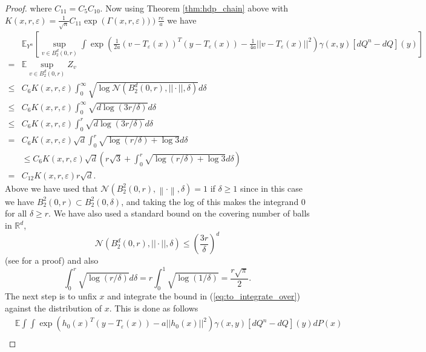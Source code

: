 \documentclass{article}
\theoremstyle{definition}
\newcommand{\Teps}{T_\varepsilon}
\newcommand{\norm}[1]{\left\lVert#1\right\rVert}
\begin{document}
\begin{proof}
    where $C_{11} = C_5C_{10}$.
    Now using Theorem \ref{thm:hdp_chain} above with $K(x, r, \varepsilon) = \frac{1}{\sqrt{n}} C_{11} \exp\left( \Gamma(x,r, \varepsilon))\right) \frac{re}{a}$ we have
    \begin{align}
        &\mathbb{E}_{Y^n} \left [ \sup_{v \in B_2^d(0,r)} \int \exp\left ( \frac{1}{2a}\left ( v - \Teps(x) \right )^T(y - \Teps(x)) - \frac{1}{4a}||v - \Teps(x)||^2 \right )\gamma(x,y)[dQ^n - dQ](y) \right ] \nonumber \\
        = & \mathbb{E} \sup_{v \in B_2^d(0,r)} Z_v \nonumber \\ 
        \leq & C_6 K(x, r, \varepsilon) \int_0^{\infty} \sqrt{\log \mathcal{N}(B_2^d(0,r), ||\cdot||, \delta)} d\delta  \nonumber \\
        \leq&  C_6 K(x, r, \varepsilon) \int_0^{\infty} \sqrt{d\log (3r/\delta)} d\delta \nonumber \\
        \leq&  C_6 K(x, r, \varepsilon) \int_0^r \sqrt{d\log (3r/\delta)} d\delta \nonumber \\
        =&  C_6 K(x, r, \varepsilon) \sqrt{d} \int_0^r \sqrt{\log (r/\delta) + \log 3}  d\delta \nonumber \\
        &\leq C_6 K(x, r, \varepsilon) \sqrt{d}\left (r\sqrt{3} + \int_0^r \sqrt{\log (r/\delta) + \log 3}  d\delta \right ) \nonumber \\
        =& C_{12}K(x, r, \varepsilon)r\sqrt{d} \label{eq:to_integrate_over}.
    \end{align}
    Above we have used that $\mathcal{N}(B_2^2(0,r), \norm{\cdot}, \delta) = 1$ if $\delta \geq 1$ since in this case we have $B_2^2(0,r) \subset B_2^2(0,\delta)$, and taking the log of this makes the integrand 0 for all $\delta \geq r$. We have also used a standard bound on the covering number of balls in $\mathbb{R}^d$,
    $$
    \mathcal{N}(B_2^d(0,r), ||\cdot||, \delta) \leq \left ( \frac{3r}{\delta} \right )^d
    $$
    (see \cite{vershynin2018high} for a proof) and also
    \begin{equation*}
        \int_{0}^r \sqrt{\log (r/\delta)} d\delta = r\int_0^1 \sqrt{\log(1/\delta)} = \frac{r\sqrt{\pi}}{2}.
    \end{equation*}
    The next step is to unfix $x$ and integrate the bound in (\ref{eq:to_integrate_over}) against the distribution of $x$. This is done as follows
    \begin{align*}
    &\mathbb{E} \int\int \exp\left (h_0(x)^T(y - \Teps(x)) - a||h_0(x)||^2 \right )\gamma(x,y) [dQ^n - dQ](y)dP(x) \\

\end{align*}
\end{proof}
\end{document}

